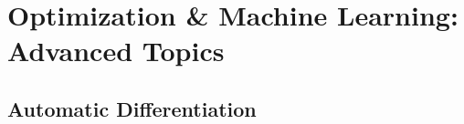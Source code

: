 \chapter{Optimization \& Machine Learning: Advanced Topics}
\label{c-smooth-optim-advanced}





\section{Automatic Differentiation}
